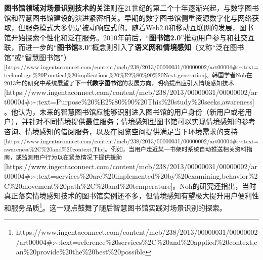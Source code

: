 \documentclass[
  letterpaper,
]{scrbook}
\begin{document}
\textbf{图书馆领域对场景识别技术的关注}则在21世纪的第二个十年逐渐兴起，与数字图书馆和智慧图书馆建设的演进紧密相关。早期的数字图书馆侧重资源数字化与网络获取，但服务模式大多仍是被动响应式的。随着Web2.0和移动互联网的发展，图书馆开始探索个性化和泛在服务。2010年前后，``\textbf{图书馆2.0}''推动用户参与和社交互联，而进一步的``\textbf{图书馆3.0}''概念则引入了\textbf{语义网和情境感知}（又称``泛在图书馆''或``智慧图书馆''）\textsuperscript{{[}https://www.ingentaconnect.com/content/mcb/238/2013/00000031/00000002/art00004\#:\textasciitilde:text=technology.\%20Practical\%20implications\%20\%E2\%80\%90\%20Next,generation{]}。韩国学者Noh在2013年的研究中系统展望了\textbf{下一代数字图书馆}的发展方向，明确提出应引入情境感知技术}{[}https://www.ingentaconnect.com/content/mcb/238/2013/00000031/00000002/art00004\#:\textasciitilde:text=Purpose\%20\%E2\%80\%90\%20This\%20study\%20seeks,awareness{]}。他认为，未来的智慧图书馆应能够识别进入图书馆的用户身份（新用户或老用户），并针对不同情境提供最佳服务；情境感知型图书馆可以实现情境感知的参考咨询、情境感知的借阅服务，以及在阅览空间提供满足当下环境需求的支持\textsuperscript{{[}https://www.ingentaconnect.com/content/mcb/238/2013/00000031/00000002/art00004\#:\textasciitilde:text=awareness\%2C\%20and\%20context,The{]}。例如，当用户走近某一书架时系统自动推送相关资料指南，或监测用户行为以在紧急情况下提供援助}{[}https://www.ingentaconnect.com/content/mcb/238/2013/00000031/00000002/art00004\#:\textasciitilde:text=services\%20are\%20implemented\%20by\%20examining,behavior\%2C\%20movement\%20path\%2C\%20and\%20temperature{]}。Noh的研究还指出，当时真正落实情境感知技术的图书馆实例还不多，但情境感知有望极大提升用户便利性和服务品质\footnote{https://www.ingentaconnect.com/content/mcb/238/2013/00000031/00000002/art00004\#:\textasciitilde:text=reference\%20services\%2C\%20and\%20applied\%20context,can\%20provide\%20the\%20best\%20possible}。这一观点鼓舞了随后智慧图书馆实践对场景识别的探索。
\end{document}
